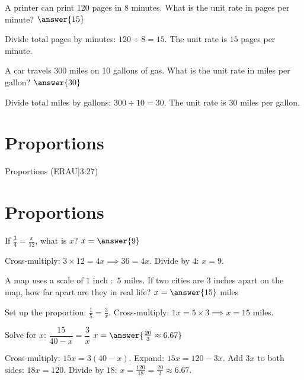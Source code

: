 \documentclass{ximera}
\begin{document}
\begin{problem}
A printer can print 120 pages in 8 minutes. What is the unit rate in pages per minute? $\answer{15}$
\begin{feedback}
Divide total pages by minutes: $120 \div 8 = 15$. The unit rate is $15$ pages per minute.
\end{feedback}
\end{problem}

\begin{problem}
A car travels 300 miles on 10 gallons of gas. What is the unit rate in miles per gallon? $\answer{30}$
\begin{feedback}
Divide total miles by gallons: $300 \div 10 = 30$. The unit rate is $30$ miles per gallon.
\end{feedback}
\end{problem}


\section*{Proportions}

Proportions (ERAU|3:27)



\section*{Proportions}

\begin{problem}
If $\frac{3}{4} = \frac{x}{12}$, what is $x$? $x=\answer{9}$
\begin{feedback}
Cross-multiply: $3 \times 12 = 4x \implies 36 = 4x$. Divide by $4$: $x = 9$.
\end{feedback}
\end{problem}

\begin{problem}
A map uses a scale of $1$ inch $:$ $5$ miles. If two cities are $3$ inches apart on the map, how far apart are they in real life? $x=\answer{15}$ miles
\begin{feedback}
Set up the proportion: $\frac{1}{5} = \frac{3}{x}$. Cross-multiply: $1x = 5 \times 3 \implies x = 15$ miles.
\end{feedback}
\end{problem}

\begin{problem}
Solve for $x$: $\dfrac{15}{40-x} = \dfrac{3}{x}$ $x=\answer{\frac{20}{3} \approx 6.67}$
\begin{feedback}
Cross-multiply: $15x = 3(40 - x)$. Expand: $15x = 120 - 3x$. Add $3x$ to both sides: $18x = 120$. Divide by $18$: $x = \frac{120}{18} = \frac{20}{3} \approx 6.67$.
\end{feedback}
\end{problem}
\end{document}
